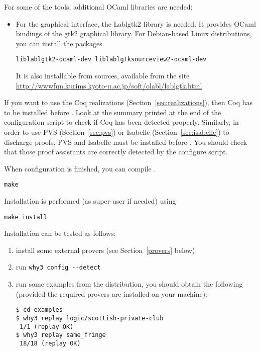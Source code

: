 \noindent
For some of the \why tools, additional OCaml libraries are needed:
\begin{itemize}
\item For the graphical interface, the Lablgtk2 library is needed.
  It provides OCaml
  bindings of the gtk2 graphical library. For Debian-based Linux
  distributions, you can install the packages
\begin{verbatim}
liblablgtk2-ocaml-dev liblablgtksourceview2-ocaml-dev
\end{verbatim}
It is also installable from sources, available from the site
\url{http://wwwfun.kurims.kyoto-u.ac.jp/soft/olabl/lablgtk.html}

\end{itemize}


If you want to use the Coq realizations
(Section~\ref{sec:realizations}), then Coq has to be installed before
\why. Look at the summary printed at the end of the configuration
script to check if Coq has been detected properly. Similarly, in order to
use PVS (Section~\ref{sec:pvs}) or Isabelle (Section~\ref{sec:isabelle})
to discharge proofs, PVS and Isabelle must be
installed before \why. You should check that those proof assistants
are correctly detected by the configure script.

When configuration is finished, you can compile \why.
\begin{verbatim}
make
\end{verbatim}
Installation is performed (as super-user if needed) using
\begin{verbatim}
make install
\end{verbatim}
Installation can be tested as follows:
\begin{enumerate}
\item install some external provers (see Section~\ref{provers} below)
\item run \verb|why3 config --detect|
\item run some examples from the distribution, \eg you should
obtain the following (provided the required provers are installed on
your machine):
\begin{verbatim}
$ cd examples
$ why3 replay logic/scottish-private-club
 1/1 (replay OK)
$ why3 replay same_fringe
 18/18 (replay OK)
\end{verbatim}
\end{enumerate}

